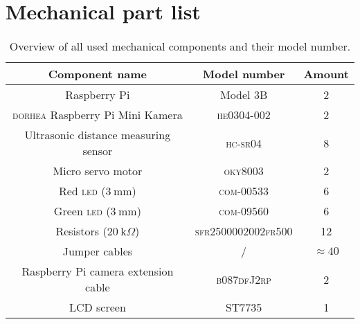 \section{Mechanical part list}\label{app:part-list}

\begin{table}[htp]
    \centering
    \caption{Overview of all used mechanical components and their model number.}
    \begin{tabular}{|c|c|c|}
        \hline
         \textbf{Component name} & \textbf{Model number} & \textbf{Amount}  \\
         \hline
         \hline
         Raspberry Pi & Model 3B & 2 \\
         \hline
         \textsc{dorhea} Raspberry Pi Mini Kamera & \textsc{he0304-002} & 2 \\
         \hline
         Ultrasonic distance measuring sensor & \textsc{hc-sr04} & 8 \\
         \hline
         Micro servo motor & \textsc{oky8003} & 2 \\
         \hline
         Red \textsc{led} ($3 \ \text{mm}$) & \textsc{com-00533} & 6 \\
         \hline
         Green \textsc{led} ($3 \ \text{mm}$) & \textsc{com-09560} & 6 \\
         \hline
         Resistors ($20 \ \text{k}\Omega$) & \textsc{sfr2500002002fr500} & 12 \\
         \hline
         Jumper cables & / & $\approx 40$ \\
         \hline
         Raspberry Pi camera extension cable & \textsc{b087dfJ2rp} & 2 \\
         \hline
         LCD screen & ST7735 & 1 \\
         \hline
         \end{tabular}
    \label{tab:part_list}
\end{table}
\clearpage